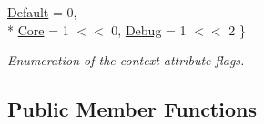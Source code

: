 \begin{DoxyCompactItemize}
\hyperlink{structsf_1_1_context_settings_af2e91e57e8d26c40afe2ec8efaa32a2ca0246d0341f162d5bd17d3c22d1bf8be1}{Default} = 0, 
\\*
\hyperlink{structsf_1_1_context_settings_af2e91e57e8d26c40afe2ec8efaa32a2cae9f568c99438d04da1f8d393efa3a3a4}{Core} = 1 $<$$<$ 0, 
\hyperlink{structsf_1_1_context_settings_af2e91e57e8d26c40afe2ec8efaa32a2ca84963e2e2ec85ef4067c210ed0381295}{Debug} = 1 $<$$<$ 2
 \}
\begin{DoxyCompactList}\small\item\em Enumeration of the context attribute flags. \end{DoxyCompactList}\end{DoxyCompactItemize}
\subsection*{Public Member Functions}
